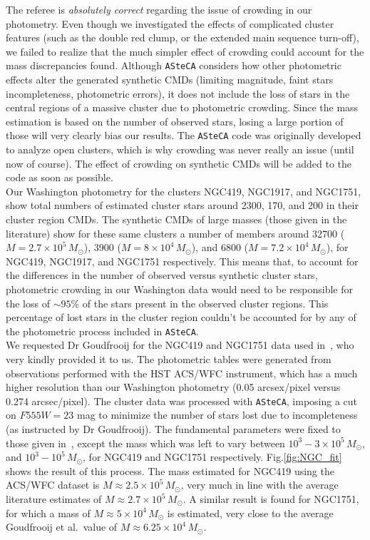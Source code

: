 \documentclass{article}
\begin{document}
The referee is \emph{absolutely correct} regarding the issue of crowding in our
photometry. Even though we investigated the effects of complicated cluster
features (such as the double red clump, or the extended main sequence turn-off),
we failed to realize that the much simpler effect of crowding could account for
the mass discrepancies found.
%
Although \texttt{ASteCA} considers how other photometric effects alter the
generated synthetic CMDs (limiting magnitude, faint stars incompleteness,
photometric errors), it does not include the loss of stars in the central
regions of a massive cluster due to photometric crowding.
%
Since the mass estimation is based on the number of observed stars, losing a
large portion of those will very clearly bias our results. The \texttt{ASteCA}
code was originally developed to analyze open clusters, which is why crowding
was never really an issue (until now of course). The effect of crowding on
synthetic CMDs will be added to the code as soon as possible.\\

Our Washington photometry for the clusters NGC419, NGC1917, and NGC1751, show
total numbers of estimated cluster stars around 2300, 170, and 200 in their
cluster region CMDs.
%
The synthetic CMDs of large masses (those given in the literature) show for
these same clusters a number of members around 32700
($M{=}2.7{\times}10^5\,M_{\odot}$), 3900 ($M{=}8{\times}10^4\,M_{\odot}$), and
6800 ($M{=}7.2{\times}10^4\,M_{\odot}$), for NGC419, NGC1917, and NGC1751
respectively.
%
This means that, to account for the differences in the number of observed versus
synthetic cluster stars, photometric crowding in our Washington data would need
to be responsible for the loss of ${\sim}95\%$ of the stars present in the
observed cluster regions.
%
This percentage of lost stars in the cluster region couldn't be accounted for by
any of the photometric process included in \texttt{ASteCA}.\\

We requested Dr Goudfrooij for the NGC419 and NGC1751 data used
in~\cite{Goudfrooij_2014}, who very kindly provided it to us. The photometric
tables were generated from observations performed with the HST ACS/WFC
instrument, which has a much higher resolution than our Washington photometry 
(0.05 arcsex/pixel versus 0.274 arcsec/pixel). The cluster data was processed
with \texttt{ASteCA}, imposing a cut on $F555W{=}23$ mag to minimize the number
of stars lost due to incompleteness (as instructed by Dr Goudfrooij). The
fundamental parameters were fixed to those given in~\cite{Goudfrooij_2014},
except the mass which was left to vary between
$10^3 - 3{\times}10^5\,M_{\odot}$, and $10^3 - 10^5\,M_{\odot}$, for NGC419 and
NGC1751 respectively.
%
Fig.\ref{fig:NGC_fit} shows the result of this process. The mass estimated
for NGC419 using the ACS/WFC dataset is $M{\approx}2.5{\times}10^5\,M_{\odot}$,
very much in line with the average literature estimates of
$M{\approx}2.7{\times}10^5\,M_{\odot}$.
A similar result is found for NGC1751, for which a mass of
$M{\approx}5{\times}10^4\,M_{\odot}$ is estimated, very close to the average
Goudfrooij et al.~value of $M{\approx}6.25{\times}10^4\,M_{\odot}$.
\end{document}
